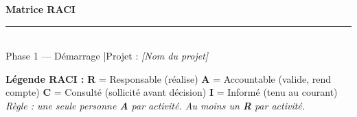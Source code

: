 \documentclass[11pt,a4paper,oneside]{report}
\begin{document}
\small

\begin{center}
{\LARGE\bfseries\color{cnNavy} Matrice RACI}\\[4pt]
\textcolor{cnOrange}{\rule{10cm}{1pt}}\\[4pt]
{\large\color{cnSlate} Phase 1 — Démarrage \quad|\quad Projet : \textit{[Nom du projet]}}
\end{center}

\vspace{6pt}

\begin{finding}
\textbf{Légende RACI :}
\textbf{R} = Responsable (réalise) \quad
\textbf{A} = Accountable (valide, rend compte) \quad
\textbf{C} = Consulté (sollicité avant décision) \quad
\textbf{I} = Informé (tenu au courant)\\
\textit{Règle : une seule personne \textbf{A} par activité. Au moins un \textbf{R} par activité.}
\end{finding}

\vspace{6pt}
\end{document}
